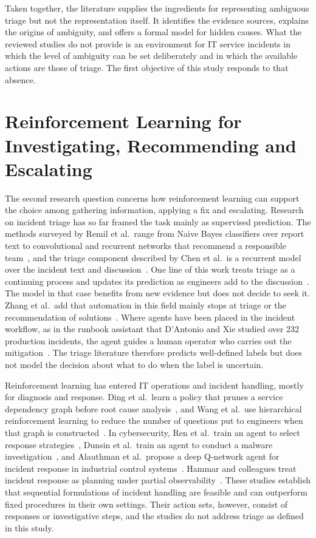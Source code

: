 Taken together, the literature supplies the ingredients for representing ambiguous triage but not the representation itself. It identifies the evidence sources, explains the origins of ambiguity, and offers a formal model for hidden causes. What the reviewed studies do not provide is an environment for IT service incidents in which the level of ambiguity can be set deliberately and in which the available actions are those of triage. The first objective of this study responds to that absence.

\section{Reinforcement Learning for Investigating, Recommending and Escalating}

The second research question concerns how reinforcement learning can support the choice among gathering information, applying a fix and escalating. Research on incident triage has so far framed the task mainly as supervised prediction. The methods surveyed by Remil et al.\ range from Naive Bayes classifiers over report text to convolutional and recurrent networks that recommend a responsible team~\cite{remil2024}, and the triage component described by Chen et al.\ is a recurrent model over the incident text and discussion~\cite{chen2020}. One line of this work treats triage as a continuing process and updates its prediction as engineers add to the discussion~\cite{remil2024,chen2020}. The model in that case benefits from new evidence but does not decide to seek it. Zhang et al.\ add that automation in this field mainly stops at triage or the recommendation of solutions~\cite{zhang2025}. Where agents have been placed in the incident workflow, as in the runbook assistant that D'Antonio and Xie studied over 232 production incidents, the agent guides a human operator who carries out the mitigation~\cite{dantonio2025}. The triage literature therefore predicts well-defined labels but does not model the decision about what to do when the label is uncertain.

Reinforcement learning has entered IT operations and incident handling, mostly for diagnosis and response. Ding et al.\ learn a policy that prunes a service dependency graph before root cause analysis~\cite{ding2023}, and Wang et al.\ use hierarchical reinforcement learning to reduce the number of questions put to engineers when that graph is constructed~\cite{wang2023hrlhf}. In cybersecurity, Ren et al.\ train an agent to select response strategies~\cite{ren2025}, Dunsin et al.\ train an agent to conduct a malware investigation~\cite{dunsin2025}, and Alauthman et al.\ propose a deep Q-network agent for incident response in industrial control systems~\cite{alauthman2026}. Hammar and colleagues treat incident response as planning under partial observability~\cite{hammar2025,hammar2026belief}. These studies establish that sequential formulations of incident handling are feasible and can outperform fixed procedures in their own settings. Their action sets, however, consist of responses or investigative steps, and the studies do not address triage as defined in this study.

